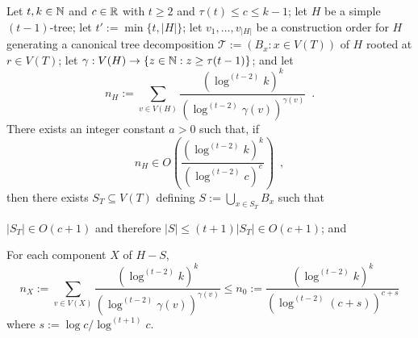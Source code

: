 \documentclass[kpfonts]{patmorin}
\theoremstyle{named}
\begin{document}
\begin{lem}\label{t-tree-no-slack-separator}
    Let $t,k\in\mathbb{N}$ and $c\in\mathbb{R}$ with $t\ge 2$ and $\tau(t)\le c\le k-1$; let $H$ be a simple $(t-1)$-tree; let $t':=\min\{t, |H|\}$; let $v_1,\ldots,v_{|H|}$ be a construction order for $H$ generating a canonical tree decomposition $\mathcal{T}:=(B_x:x\in V(T))$ of $H$ rooted at $r\in V(T)$; let $\gamma:V(H)\to\{z\in\mathbb{N}: z\ge \tau(t-1)\}$; and let
    \[
        n_H:=\sum_{v\in V(H)} \frac{\left(\log^{(t-2)} k\right)^k}{\left(\log^{(t-2)} \gamma(v)\right)^{\gamma(v)}} \enspace .
    \]
    There exists an integer constant $a>0$ such that,
    if
    \begin{equation}
         n_H \in O\left( \frac{(\log^{(t-2)} k)^k}{(\log^{(t-2)} c)^{c}} \right)\enspace ,
     \label{total-weight-ii}
    \end{equation}
    then there exists $S_T\subseteq V(T)$ defining $S:=\bigcup_{x\in S_T} B_x$ such that
    \begin{compactenum}
        \item $|S_T|\in O(c+1)$ and therefore $|S|\le (t+1)|S_T|\in O(c+1)$; and
        \item For each component $X$ of $H-S$,
        \[
            n_X:=\sum_{v\in V(X)} \frac{\left(\log^{(t-2)} k\right)^k}{\left(\log^{(t-2)} \gamma(v)\right)^{\gamma(v)}}
            \le n_0 :=
            \frac{\left(\log^{(t-2)} k\right)^k}{\left(\log^{(t-2)} (c+s)\right)^{c+s}}
        \]
        where $s:=\log c/\log^{(t+1)} c$.
    \end{compactenum}
\end{lem}
\end{document}
